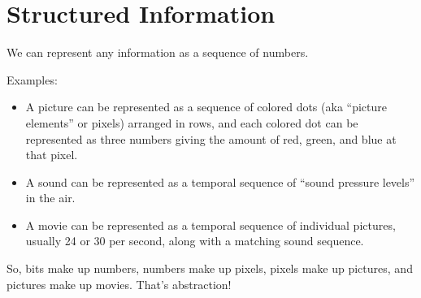 \documentclass[8pt,a4paper,compress,handout]{beamer}
\begin{document}
\section{Structured Information}
\begin{frame}[fragile]
We can represent any information as a sequence of numbers.

\bigskip

Examples: 
\begin{itemize}
\item A picture can be represented as a sequence of colored dots (aka ``picture elements'' or pixels) arranged in rows, and each colored dot can be represented as three numbers giving the amount of red, green, and blue at that pixel.

\item A sound can be represented as a temporal sequence of ``sound pressure levels'' in the air.

\item A movie can be represented as a temporal sequence of individual pictures, usually 24 or 30 per second, along with a matching sound sequence.
\end{itemize}

\bigskip

So, bits make up numbers, numbers make up pixels, pixels make up pictures, and pictures make up movies. That's abstraction! 
\end{frame}
\end{document}
